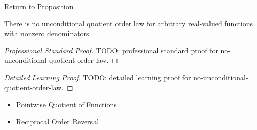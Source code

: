 \newpage
{}
\label{prf:no-unconditional-quotient-order-law}

\begin{remark*}[Return]
\hyperref[prop:no-unconditional-quotient-order-law]{Return to Proposition}
\end{remark*}

\begin{proposition*}
There is no unconditional quotient order law for arbitrary real-valued
functions with nonzero denominators.
\end{proposition*}

\begin{proof}[Professional Standard Proof]
\LRAProofBodyStart
TODO: professional standard proof for no-unconditional-quotient-order-law.
\end{proof}

\begin{proof}[Detailed Learning Proof]
\LRAProofBodyStart
TODO: detailed learning proof for no-unconditional-quotient-order-law.
\end{proof}

\begin{remark*}
\end{remark*}

\begin{dependencies}
\begin{itemize}
  \item \hyperref[def:pointwise-quotient-of-functions]{Pointwise Quotient of Functions}
  \item \hyperref[prop:reciprocal-order-reversal]{Reciprocal Order Reversal}
\end{itemize}
\end{dependencies}

\clearpage
